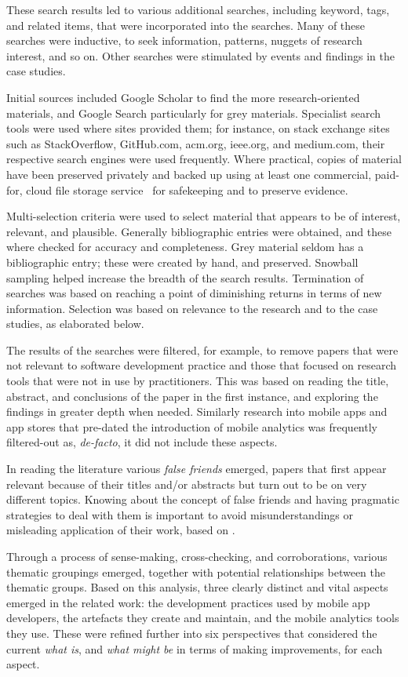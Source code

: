 These search results led to various additional searches, including keyword, tags, and related items, that were incorporated into the searches. Many of these searches were inductive, to seek information, patterns, nuggets of research interest, and so on. Other searches were stimulated by events and findings in the case studies.

Initial sources included Google Scholar to find the more research-oriented materials, and Google Search particularly for grey materials. Specialist search tools were used where sites provided them; for instance, on stack exchange sites such as StackOverflow, GitHub.com, acm.org, ieee.org, and medium.com, their respective search engines were used frequently. Where practical, copies of material have been preserved privately and backed up using at least one commercial, paid-for, cloud file storage service~ for safekeeping and to preserve evidence.

Multi-selection criteria were used to select material that appears to be of interest, relevant, and plausible. Generally bibliographic entries were obtained, and these where checked for accuracy and completeness. Grey material seldom has a bibliographic entry; these were created by hand, and preserved. Snowball sampling helped increase the breadth of the search results. Termination of searches was based on reaching a point of diminishing returns in terms of new information. Selection was based on relevance to the research and to the case studies, as elaborated below.

The results of the searches were filtered, for example, to remove papers that were not relevant to software development practice and those that focused on research tools that were not in use by practitioners. This was based on reading the title, abstract, and conclusions of the paper in the first instance, and exploring the findings in greater depth when needed. Similarly research into mobile apps and app stores that pre-dated the introduction of mobile analytics was frequently filtered-out as, \emph{de-facto}, it did not include these aspects.

In reading the literature various \textit{false friends} emerged, papers that first appear relevant because of their titles and/or abstracts but turn out to be on very different topics. 
Knowing about the concept of false friends and having pragmatic strategies to deal with them is important to avoid misunderstandings or misleading application of their work, 
based on . 

Through a process of sense-making, cross-checking, and corroborations, various thematic groupings emerged, together with potential relationships between the thematic groups. Based on this analysis, three clearly distinct and vital aspects emerged in the related work:  the development practices used by mobile app developers, the artefacts they create and maintain, and the mobile analytics tools they use. These were refined further into six perspectives that considered the current \emph{what is}, and \emph{what might be} in terms of making improvements, for each aspect. 

